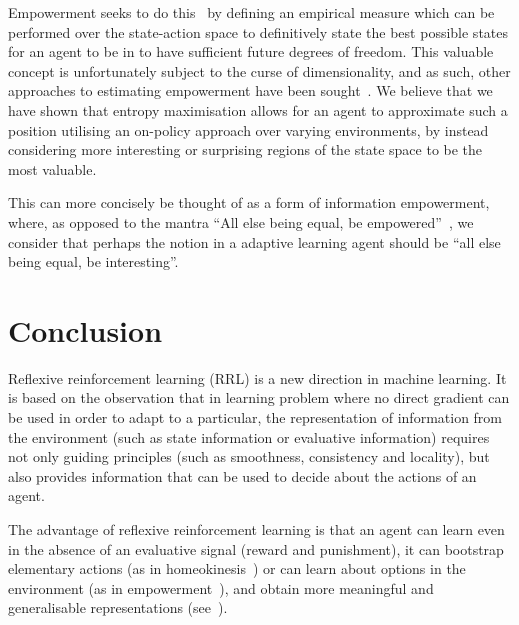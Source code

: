 \documentclass{article}
\begin{document}
Empowerment seeks to do this~\citep{salge2014empowerment} by defining an empirical measure which can be performed over the state-action space to definitively state the best possible states for an agent to be in to have sufficient future degrees of freedom. This valuable concept is unfortunately subject to the curse of dimensionality, and as such, other approaches to estimating empowerment have been sought~\citep{zhao2019learning}. We believe that we have shown that entropy maximisation allows for an agent to approximate such a position utilising an on-policy approach over varying environments, by instead considering more interesting or surprising regions of the state space to be the most valuable.

This can more concisely be thought of as a form of information empowerment, where, as opposed to the mantra ``All else being equal, be empowered''~\citep{klyubin2005all}, we consider that perhaps the notion in a adaptive learning agent should be ``all else being equal, be interesting''.



\section{Conclusion}

Reflexive reinforcement learning (RRL) is a new direction in machine learning. It is based on the observation that in learning problem where no direct gradient can be used in order to adapt to a particular, the representation of information from the environment (such as state information or evaluative information) requires not only guiding principles (such as smoothness, consistency and locality), but also provides information that can be used to decide about the actions of an agent.

The advantage of reflexive reinforcement learning is that an agent can learn 
even in the absence of an evaluative signal (reward and punishment), it can 
bootstrap elementary actions (as in homeokinesis~\citep{der2012playful}) or can learn about options in the environment (as in empowerment~\citep{klyubin2005empowerment}),
and obtain more meaningful and generalisable 
representations (see~\citep{smith2018evaluation}).
\end{document}

